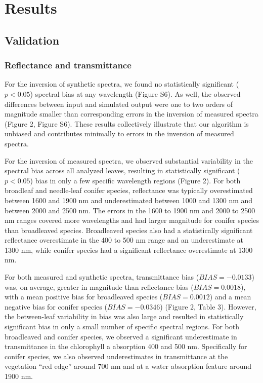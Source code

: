 \section{Results}\label{sec:pecanrtm-results}

\subsection{Validation}

\subsubsection{Reflectance and transmittance}

For the inversion of synthetic spectra, we found no statistically significant ($p < 0.05$) spectral bias at any wavelength (Figure S6). %
As well, the observed differences between input and simulated output were one to two orders of magnitude smaller than corresponding errors in the inversion of measured spectra (Figure 2, Figure S6). %
These results collectively illustrate that our algorithm is unbiased and contributes minimally to errors in the inversion of measured spectra.

For the inversion of measured spectra, we observed substantial variability in the spectral bias across all analyzed leaves, resulting in statistically significant ($p < 0.05$) bias in only a few specific wavelength regions (Figure 2). %
For both broadleaf and needle-leaf conifer species, reflectance was typically overestimated between 1600 and 1900 nm and underestimated between 1000 and 1300 nm and between 2000 and 2500 nm.
The errors in the 1600 to 1900 nm and 2000 to 2500 nm ranges covered more wavelengths and had larger magnitude for conifer species than broadleaved species.
Broadleaved species also had a statistically significant reflectance overestimate in the 400 to 500 nm range and an underestimate at 1300 nm, while conifer species had a significant reflectance overestimate at 1300 nm.

For both measured and synthetic spectra, transmittance bias ($BIAS = -0.0133$) was, on average, greater in magnitude than reflectance bias ($BIAS = 0.0018$), with a mean positive bias for broadleaved species ($BIAS = 0.0012$) and a mean negative bias for conifer species ($BIAS = -0.0346$) (Figure 2, Table 3). %
However, the between-leaf variability in bias was also large and resulted in statistically significant bias in only a small number of specific spectral regions.
For both broadleaved and conifer species, we observed a significant underestimate in transmittance in the chlorophyll a absorption 400 and 500 nm.
Specifically for conifer species, we also observed underestimates in transmittance at the vegetation “red edge” around 700 nm and at a water absorption feature around 1900 nm.

